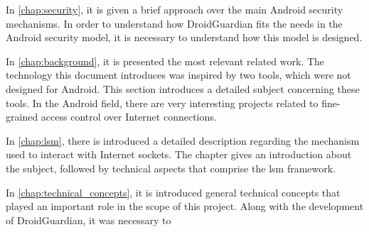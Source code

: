 In \autoref{chap:security}, it is given a brief approach over the main Android security mechanisms. In order to understand how DroidGuardian fits the needs in the Android security model, it is necessary to understand how this model is designed.

In \autoref{chap:background}, it is presented the most relevant related work. The technology this document introduces was inspired by two tools, which were not designed for Android. This section introduces a detailed subject concerning these tools. In the Android field, there are very interesting projects related to fine-grained access control over Internet connections.

In \autoref{chap:lsm}, there is introduced a detailed description regarding the mechanism used to interact with Internet sockets. The chapter gives an introduction about the subject, followed by technical aspects that comprise the \gls{lsm} framework.

In \autoref{chap:technical_concepts}, it is introduced general technical concepts that played an important role in the scope of this project. Along with the development of DroidGuardian, it was necessary to 